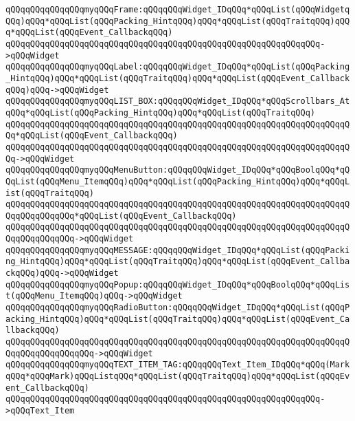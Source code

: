 \verb|qQQqqQQqqQQqqQQqmyqQQqFrame:qQQqqQQqWidget_IDqQQq*qQQqList(qQQqWidgetqQQq)qQQq*qQQqList(qQQqPacking_HintqQQq)qQQq*qQQqList(qQQqTraitqQQq)qQQq*qQQqList(qQQqEvent_CallbackqQQq)|\newline
\verb|qQQqqQQqqQQqqQQqqQQqqQQqqQQqqQQqqQQqqQQqqQQqqQQqqQQqqQQqqQQqqQQq->qQQqWidget|\newline
\verb|qQQqqQQqqQQqqQQqmyqQQqLabel:qQQqqQQqWidget_IDqQQq*qQQqList(qQQqPacking_HintqQQq)qQQq*qQQqList(qQQqTraitqQQq)qQQq*qQQqList(qQQqEvent_CallbackqQQq)qQQq->qQQqWidget|\newline
\verb|qQQqqQQqqQQqqQQqmyqQQqLIST_BOX:qQQqqQQqWidget_IDqQQq*qQQqScrollbars_AtqQQq*qQQqList(qQQqPacking_HintqQQq)qQQq*qQQqList(qQQqTraitqQQq)|\newline
\verb|qQQqqQQqqQQqqQQqqQQqqQQqqQQqqQQqqQQqqQQqqQQqqQQqqQQqqQQqqQQqqQQqqQQqqQQq*qQQqList(qQQqEvent_CallbackqQQq)|\newline
\verb|qQQqqQQqqQQqqQQqqQQqqQQqqQQqqQQqqQQqqQQqqQQqqQQqqQQqqQQqqQQqqQQqqQQqqQQq->qQQqWidget|\newline
\verb|qQQqqQQqqQQqqQQqmyqQQqMenuButton:qQQqqQQqWidget_IDqQQq*qQQqBoolqQQq*qQQqList(qQQqMenu_ItemqQQq)qQQq*qQQqList(qQQqPacking_HintqQQq)qQQq*qQQqList(qQQqTraitqQQq)|\newline
\verb|qQQqqQQqqQQqqQQqqQQqqQQqqQQqqQQqqQQqqQQqqQQqqQQqqQQqqQQqqQQqqQQqqQQqqQQqqQQqqQQqqQQq*qQQqList(qQQqEvent_CallbackqQQq)|\newline
\verb|qQQqqQQqqQQqqQQqqQQqqQQqqQQqqQQqqQQqqQQqqQQqqQQqqQQqqQQqqQQqqQQqqQQqqQQqqQQqqQQqqQQq->qQQqWidget|\newline
\verb|qQQqqQQqqQQqqQQqmyqQQqMESSAGE:qQQqqQQqWidget_IDqQQq*qQQqList(qQQqPacking_HintqQQq)qQQq*qQQqList(qQQqTraitqQQq)qQQq*qQQqList(qQQqEvent_CallbackqQQq)qQQq->qQQqWidget|\newline
\verb|qQQqqQQqqQQqqQQqmyqQQqPopup:qQQqqQQqWidget_IDqQQq*qQQqBoolqQQq*qQQqList(qQQqMenu_ItemqQQq)qQQq->qQQqWidget|\newline
\verb|qQQqqQQqqQQqqQQqmyqQQqRadioButton:qQQqqQQqWidget_IDqQQq*qQQqList(qQQqPacking_HintqQQq)qQQq*qQQqList(qQQqTraitqQQq)qQQq*qQQqList(qQQqEvent_CallbackqQQq)|\newline
\verb|qQQqqQQqqQQqqQQqqQQqqQQqqQQqqQQqqQQqqQQqqQQqqQQqqQQqqQQqqQQqqQQqqQQqqQQqqQQqqQQqqQQqqQQq->qQQqWidget|\newline
\verb|qQQqqQQqqQQqqQQqmyqQQqTEXT_ITEM_TAG:qQQqqQQqText_Item_IDqQQq*qQQq(MarkqQQq*qQQqMark)qQQqListqQQq*qQQqList(qQQqTraitqQQq)qQQq*qQQqList(qQQqEvent_CallbackqQQq)|\newline
\verb|qQQqqQQqqQQqqQQqqQQqqQQqqQQqqQQqqQQqqQQqqQQqqQQqqQQqqQQqqQQqqQQq->qQQqText_Item|\newline
